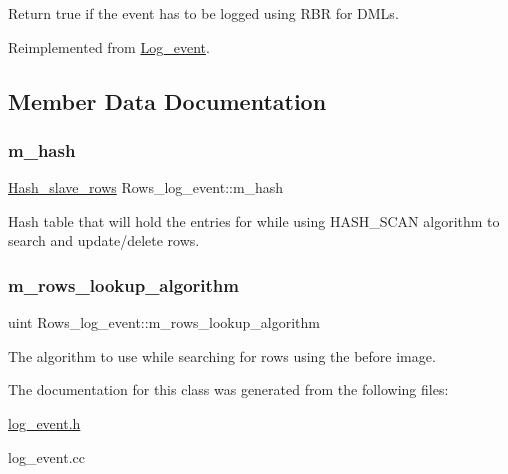 Return true if the event has to be logged using R\+BR for D\+M\+Ls. 

Reimplemented from \mbox{\hyperlink{classLog__event_abd996ad9f33a59c3b03737beb2c2869d}{Log\+\_\+event}}.



\subsection{Member Data Documentation}
\mbox{\label{classRows__log__event_a4e650c9f7bb9f4a75b63340cc2eb3a60}} 
\subsubsection{\texorpdfstring{m\+\_\+hash}{m\_hash}}
{\footnotesize\ttfamily \mbox{\hyperlink{classHash__slave__rows}{Hash\+\_\+slave\+\_\+rows}} Rows\+\_\+log\+\_\+event\+::m\+\_\+hash\hspace{0.3cm}{\ttfamily [protected]}}

Hash table that will hold the entries for while using H\+A\+S\+H\+\_\+\+S\+C\+AN algorithm to search and update/delete rows. \mbox{\label{classRows__log__event_a34154d5894f717b32ccff5803a14f62e}} 
\subsubsection{\texorpdfstring{m\+\_\+rows\+\_\+lookup\+\_\+algorithm}{m\_rows\_lookup\_algorithm}}
{\footnotesize\ttfamily uint Rows\+\_\+log\+\_\+event\+::m\+\_\+rows\+\_\+lookup\+\_\+algorithm\hspace{0.3cm}{\ttfamily [protected]}}

The algorithm to use while searching for rows using the before image. 

The documentation for this class was generated from the following files\+:\begin{DoxyCompactItemize}
\item 
\mbox{\hyperlink{log__event_8h}{log\+\_\+event.\+h}}\item 
log\+\_\+event.\+cc\end{DoxyCompactItemize}

